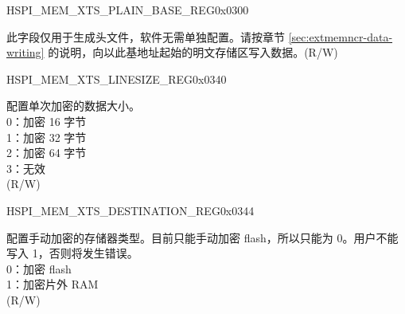 
\begin{register}{H}{SPI\_MEM\_XTS\_PLAIN\_BASE\_REG}{0x0300}\label{regdesc:SPIMEMXTSPLAINBASEREG}
%
\regnewline%
\begin{regdesc}\begin{reglist}
\label{fielddesc:SPIMEMXTSPLAIN}\item [SPI\_MEM\_XTS\_PLAIN] 此字段仅用于生成头文件，软件无需单独配置。请按章节 \ref{sec:extmemncr-data-writing} 的说明，向以此基地址起始的明文存储区写入数据。(R/W)
\end{reglist}\end{regdesc}
\end{register}


\begin{register}{H}{SPI\_MEM\_XTS\_LINESIZE\_REG}{0x0340}\label{regdesc:SPIMEMXTSLINESIZEREG}
%
%
\regnewline%
\begin{regdesc}\begin{reglist}
\label{fielddesc:SPIMEMXTSLINESIZE}\item [SPI\_MEM\_XTS\_LINESIZE] 配置单次加密的数据大小。\\
0：加密 16 字节\\
1：加密 32 字节\\
2：加密 64 字节\\
3：无效\\
(R/W)
\end{reglist}\end{regdesc}
\end{register}

\begin{register}{H}{SPI\_MEM\_XTS\_DESTINATION\_REG}{0x0344}\label{regdesc:SPIMEMXTSDESTINATIONREG}
%
%
\regnewline%
\begin{regdesc}\begin{reglist}
\label{fielddesc:SPIMEMXTSDESTINATION}\item [SPI\_MEM\_XTS\_DESTINATION] 配置手动加密的存储器类型。目前只能手动加密 flash，所以只能为 0。用户不能写入 1，否则将发生错误。\\
0：加密 flash\\
1：加密片外 RAM\\
(R/W)
\end{reglist}\end{regdesc}
\end{register}


